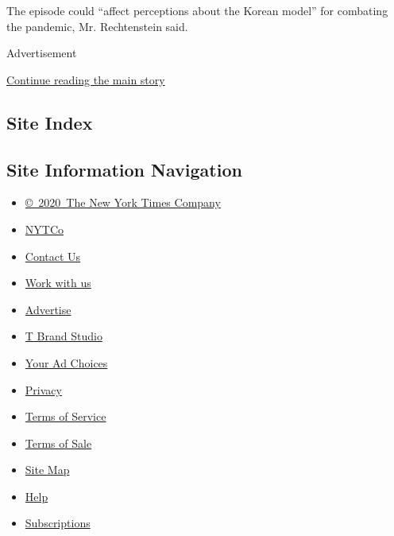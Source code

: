 The episode could ``affect perceptions about the Korean model'' for
combating the pandemic, Mr. Rechtenstein said.

Advertisement

\protect\hyperlink{after-bottom}{Continue reading the main story}

\hypertarget{site-index}{%
\subsection{Site Index}\label{site-index}}

\hypertarget{site-information-navigation}{%
\subsection{Site Information
Navigation}\label{site-information-navigation}}

\begin{itemize}
\tightlist
\item
  \href{https://help.nytimes.com/hc/en-us/articles/115014792127-Copyright-notice}{©~2020~The
  New York Times Company}
\end{itemize}

\begin{itemize}
\tightlist
\item
  \href{https://www.nytco.com/}{NYTCo}
\item
  \href{https://help.nytimes.com/hc/en-us/articles/115015385887-Contact-Us}{Contact
  Us}
\item
  \href{https://www.nytco.com/careers/}{Work with us}
\item
  \href{https://nytmediakit.com/}{Advertise}
\item
  \href{http://www.tbrandstudio.com/}{T Brand Studio}
\item
  \href{https://www.nytimes.com/privacy/cookie-policy\#how-do-i-manage-trackers}{Your
  Ad Choices}
\item
  \href{https://www.nytimes.com/privacy}{Privacy}
\item
  \href{https://help.nytimes.com/hc/en-us/articles/115014893428-Terms-of-service}{Terms
  of Service}
\item
  \href{https://help.nytimes.com/hc/en-us/articles/115014893968-Terms-of-sale}{Terms
  of Sale}
\item
  \href{https://spiderbites.nytimes.com}{Site Map}
\item
  \href{https://help.nytimes.com/hc/en-us}{Help}
\item
  \href{https://www.nytimes.com/subscription?campaignId=37WXW}{Subscriptions}
\end{itemize}
